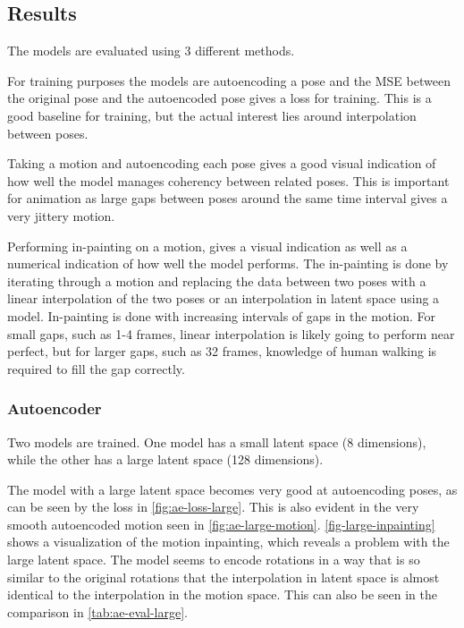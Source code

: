 \subsection{Results}\label{subsec:results}
The models are evaluated using 3 different methods.

For training purposes the models are autoencoding a pose and the MSE between the original pose and the autoencoded pose gives a loss for training. This is a good baseline for training, but the actual interest lies around interpolation between poses.

Taking a motion and autoencoding each pose gives a good visual indication of how well the model manages coherency between related poses. This is important for animation as large gaps between poses around the same time interval gives a very jittery motion.

Performing in-painting on a motion, gives a visual indication as well as a numerical indication of how well the model performs. The in-painting is done by iterating through a motion and replacing the data between two poses with a linear interpolation of the two poses or an interpolation in latent space using a model. In-painting is done with increasing intervals of gaps in the motion. For small gaps, such as 1-4 frames, linear interpolation is likely going to perform near perfect, but for larger gaps, such as 32 frames, knowledge of human walking is required to fill the gap correctly.

\subsubsection{Autoencoder}\label{subsubsec:ae}
Two models are trained. One model has a small latent space (8 dimensions), while the other has a large latent space (128 dimensions).

The model with a large latent space becomes very good at autoencoding poses, as can be seen by the loss in \autoref{fig:ae-loss-large}. This is also evident in the very smooth autoencoded motion seen in \autoref{fig:ae-large-motion}. \autoref{fig-large-inpainting} shows a visualization of the motion inpainting, which reveals a problem with the large latent space. The model seems to encode rotations in a way that is so similar to the original rotations that the interpolation in latent space is almost identical to the interpolation in the motion space. This can also be seen in the comparison in \autoref{tab:ae-eval-large}.

